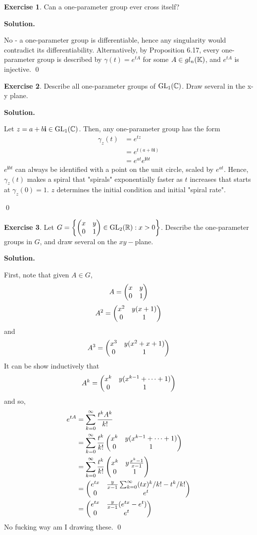 \documentclass[12pt]{book}
\theoremstyle{definition}
\newtheorem{exercise}{Exercise}[chapter]
\newenvironment{solution}
{%
  \par\noindent\textbf{Solution.}\quad
}
{%
  \qed\par
}
\begin{document}
\begin{exercise}
  Can a one-parameter group ever cross itself?
\end{exercise}

\begin{solution}
  No - a one-parameter group is differentiable, hence any singularity would contradict its differentiability.
  Alternatively, by Proposition 6.17, every one-parameter group is described by $\gamma(t) = e^{tA}$ for some $A \in gl_n(\mathbb{K})$, and $e^{tA}$ is injective.
\end{solution}

\begin{exercise}
  Describe all one-parameter groups of $\mathrm{GL}_{1}(\mathbb{C})$.
  Draw several in the x-y plane.
\end{exercise}

\begin{solution}
  Let $z = a + b\mathbf{i} \in \mathrm{GL}_{1}(\mathbb{C})$.
  Then, any one-parameter group has the form
  \[\begin{aligned}
    \gamma_z(t) &= e^{tz} \\
                &= e^{t(a+ b\mathbf{i})} \\
                &= e^{at}e^{\mathbf{i}bt}
  \end{aligned}
  \]
  $e^{\mathbf{i}bt}$ can always be identified with a point on the unit circle, scaled by $e^{at}$.
  Hence, $\gamma_z(t)$ makes a spiral that "spirals" exponentially faster as $t$ increases that starts at $\gamma_z(0) = 1$.
  $z$ determines the initial condition and initial "spiral rate".

\end{solution}

\begin{exercise}
  Let $G = \left\{ \begin{pmatrix} x & y \\ 0 & 1 \end{pmatrix} \in \mathrm{GL}_{2}(\mathbb{R}) : x > 0 \right\}$.
  Describe the one-parameter groups in $G$, and draw several on the $xy-$plane.
\end{exercise}

\begin{solution}
  First, note that given $A \in G$,
  \[
   A = \begin{pmatrix} x & y \\ 0 & 1 \end{pmatrix}
  \]
  \[A^2 =  \begin{pmatrix} x^2 & y(x+1) \\ 0 & 1 \end{pmatrix}\]
  and
  \[A^3 = \begin{pmatrix} x^3 & y(x^2 + x + 1) \\ 0 & 1 \end{pmatrix}\]
  It can be show inductively that
  \[
  A^k = \begin{pmatrix} x^k & y(x^{k-1} + \cdots + 1) \\ 0 & 1 \end{pmatrix}
  \]
  and so,
  \[
  \begin{aligned}
    e^{tA} &= \sum_{k=0}^\infty \frac{t^kA^k}{k!} \\
           &= \sum_{k=0}^\infty \frac{t^k}{k!} \begin{pmatrix} x^k & y(x^{k-1} + \cdots + 1) \\ 0 & 1 \end{pmatrix} \\
           &= \sum_{k=0}^\infty \frac{t^k}{k!} \begin{pmatrix} x^k & y\frac{x^k-1}{x-1} \\ 0 & 1 \end{pmatrix} \\
           &= \begin{pmatrix} e^{tx} & \frac{y}{x-1}\sum_{k=0}^\infty (tx)^k/k! - t^k/k! \\ 0 & e^t \end{pmatrix} \\
           &= \begin{pmatrix} e^{tx} & \frac{y}{x-1}(e^{tx} - e^t) \\ 0 & e^t \end{pmatrix} \\
  \end{aligned}
  \]
  No fucking way am I drawing these.
\end{solution}
\end{document}
